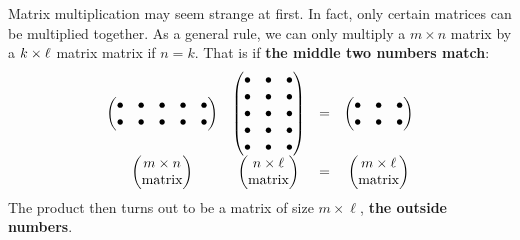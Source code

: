 \documentclass{ximera}
\begin{document}
Matrix multiplication may seem strange at first. In fact, only certain
matrices can be multiplied together. As a general rule, we can only
multiply a $m \times n$ matrix by a $k \times \ell$ matrix matrix if
$n=k$. That is if \textbf{the middle two numbers match}:
\[
  \begin{matrix}
    \begin{pmatrix}
      \bullet & \bullet & \bullet & \bullet & \bullet\\
      \bullet & \bullet & \bullet & \bullet & \bullet\\
    \end{pmatrix}
    &
      \begin{pmatrix}
        \bullet & \bullet &\bullet \\\bullet & \bullet & \bullet \\  \bullet & \bullet & \bullet \\\bullet & \bullet & \bullet \\ \bullet & \bullet & \bullet \end{pmatrix} &= &
                                                                                                                                                                                 \begin{pmatrix}
                                                                                                                                                                                   \bullet & \bullet &\bullet \\\bullet & \bullet &  \bullet
                                                                                                                                                                                 \end{pmatrix}\\
    \begin{pmatrix}
      m\times n\\
      \text{matrix}
    \end{pmatrix} &
                    \begin{pmatrix}
                      n\times \ell\\
                      \text{matrix}
                    \end{pmatrix}
    &= & \begin{pmatrix}
      m\times \ell\\
      \text{matrix}
    \end{pmatrix}
  \end{matrix}
\]
The product then turns out to be a matrix of size $m\times \ell$, \textbf{the
  outside numbers}.
\end{document}
